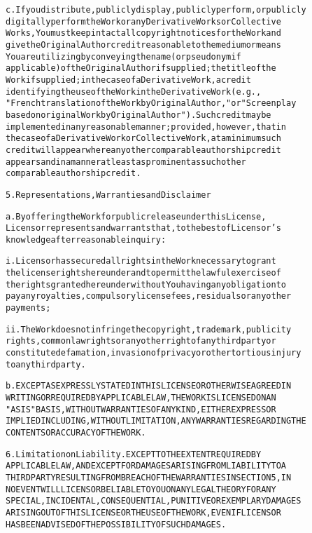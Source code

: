 \documentclass{report}
\begin{document}
\begin{alltt}
c. If you distribute, publicly display, publicly perform, or publicly
   digitally perform the Work or any Derivative Works or Collective
   Works, You must keep intact all copyright notices for the Work and
   give the Original Author credit reasonable to the medium or means
   You are utilizing by conveying the name (or pseudonym if
   applicable) of the Original Author if supplied; the title of the
   Work if supplied; in the case of a Derivative Work, a credit
   identifying the use of the Work in the Derivative Work (e.g.,
   "French translation of the Work by Original Author," or "Screenplay
   based on original Work by Original Author"). Such credit may be
   implemented in any reasonable manner; provided, however, that in
   the case of a Derivative Work or Collective Work, at a minimum such
   credit will appear where any other comparable authorship credit
   appears and in a manner at least as prominent as such other
   comparable authorship credit.

5. Representations, Warranties and Disclaimer

a. By offering the Work for public release under this License,
   Licensor represents and warrants that, to the best of Licensor's
   knowledge after reasonable inquiry:

   i. Licensor has secured all rights in the Work necessary to grant
   the license rights hereunder and to permit the lawful exercise of
   the rights granted hereunder without You having any obligation to
   pay any royalties, compulsory license fees, residuals or any other
   payments;

   ii. The Work does not infringe the copyright, trademark, publicity
   rights, common law rights or any other right of any third party or
   constitute defamation, invasion of privacy or other tortious injury
   to any third party.

b. EXCEPT AS EXPRESSLY STATED IN THIS LICENSE OR OTHERWISE AGREED IN
   WRITING OR REQUIRED BY APPLICABLE LAW, THE WORK IS LICENSED ON AN
   "AS IS" BASIS, WITHOUT WARRANTIES OF ANY KIND, EITHER EXPRESS OR
   IMPLIED INCLUDING, WITHOUT LIMITATION, ANY WARRANTIES REGARDING THE
   CONTENTS OR ACCURACY OF THE WORK.

6. Limitation on Liability. EXCEPT TO THE EXTENT REQUIRED BY
APPLICABLE LAW, AND EXCEPT FOR DAMAGES ARISING FROM LIABILITY TO A
THIRD PARTY RESULTING FROM BREACH OF THE WARRANTIES IN SECTION 5, IN
NO EVENT WILL LICENSOR BE LIABLE TO YOU ON ANY LEGAL THEORY FOR ANY
SPECIAL, INCIDENTAL, CONSEQUENTIAL, PUNITIVE OR EXEMPLARY DAMAGES
ARISING OUT OF THIS LICENSE OR THE USE OF THE WORK, EVEN IF LICENSOR
HAS BEEN ADVISED OF THE POSSIBILITY OF SUCH DAMAGES.


\end{alltt}
\end{document}
